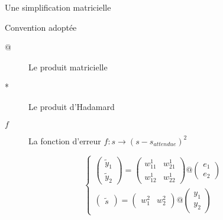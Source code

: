 \begin{frame}{Une simplification matricielle}
    \begin{block}{Convention adoptée}
        \begin{description}
            \item[@] Le produit matricielle
            \item[*] Le produit d'Hadamard
            \item[$f$] La fonction d'erreur $f:s \rightarrow (s-s_{attendue})^2$
        \end{description}
    \end{block}
    \begin{equation}
        \begin{cases}
            \begin{pmatrix}
                \tilde{y}_1 \\
                \tilde{y}_2
            \end{pmatrix}
            =
            \begin{pmatrix}
                w^1_{11} & w^1_{21} \\
                w^1_{12} & w^1_{22}
            \end{pmatrix}
            @
            \begin{pmatrix}
                e_1 \\
                e_2
            \end{pmatrix}\\
            \begin{pmatrix}
                \tilde{s}
            \end{pmatrix}
            =
            \begin{pmatrix}
                w^2_{1} & w^2_{2}
            \end{pmatrix}
            @
            \begin{pmatrix}
                y_1 \\
                y_2
            \end{pmatrix}
        \end{cases}
    \end{equation}
\end{frame}

